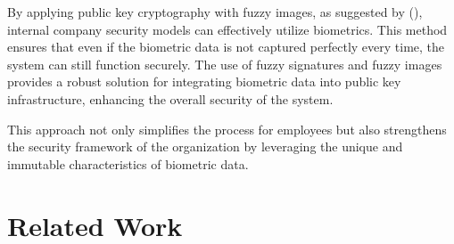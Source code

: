 \documentclass[graybox]{svmult}
\begin{document}
By applying public key cryptography with fuzzy images, as suggested by \citeauthor{Son2016} (\citeyear{Son2016}), internal company security models can effectively utilize biometrics. This method ensures that even if the biometric data is not captured perfectly every time, the system can still function securely. The use of fuzzy signatures and fuzzy images provides a robust solution for integrating biometric data into public key infrastructure, enhancing the overall security of the system.

This approach not only simplifies the process for employees but also strengthens the security framework of the organization by leveraging the unique and immutable characteristics of biometric data.

\section{Related Work}
\end{document}
